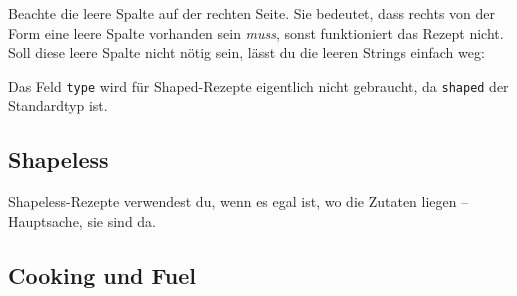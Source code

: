 Beachte die leere Spalte auf der rechten Seite. Sie bedeutet, dass
rechts von der Form eine leere Spalte vorhanden sein \emph{muss}, sonst
funktioniert das Rezept nicht. Soll diese leere Spalte nicht nötig sein,
lässt du die leeren Strings einfach weg:

\begin{Shaded}
\begin{Highlighting}[]
\OperatorTok{(\{}
     \OperatorTok{=} \OperatorTok{,}
     \OperatorTok{=} \OperatorTok{\{}
        \OperatorTok{\{} \OperatorTok{,}    \OperatorTok{\},}
        \OperatorTok{\{} \OperatorTok{,}  \OperatorTok{\},}
        \OperatorTok{\{} \OperatorTok{,}  \OperatorTok{\},}
    \OperatorTok{\},}
\OperatorTok{\})}
\end{Highlighting}
\end{Shaded}

Das Feld \texttt{type} wird für Shaped-Rezepte eigentlich nicht
gebraucht, da \texttt{shaped} der Standardtyp ist.

\subsection{Shapeless}\label{shapeless}

Shapeless-Rezepte verwendest du, wenn es egal ist, wo die Zutaten liegen
-- Hauptsache, sie sind da.

\begin{Shaded}
\begin{Highlighting}[]
\OperatorTok{(\{}
     \OperatorTok{=} \OperatorTok{,}
     \OperatorTok{=} \OperatorTok{,}
     \OperatorTok{=} \OperatorTok{\{}
        \OperatorTok{,}
        \OperatorTok{,}
        \OperatorTok{,}
    \OperatorTok{\},}
\OperatorTok{\})}
\end{Highlighting}
\end{Shaded}

\subsection{Cooking und Fuel}\label{cooking-und-fuel}

